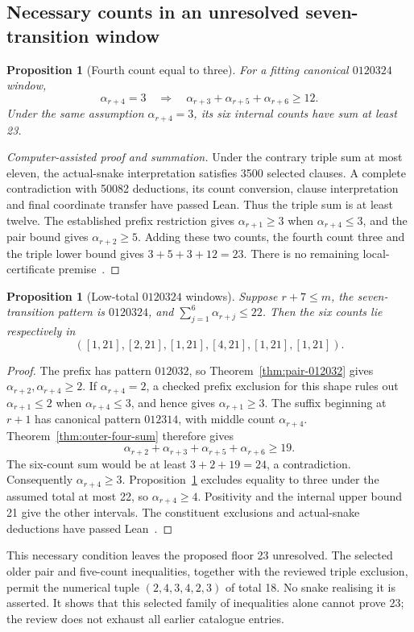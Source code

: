 \documentclass[11pt,a4paper]{article}
\newtheorem{proposition}[theorem]{Proposition}
\theoremstyle{definition}
\theoremstyle{remark}
\begin{document}
\subsection{Necessary counts in an unresolved seven-transition window}\label{sec:critical-six}
\begin{proposition}[Fourth count equal to three]\label{prop:fourth-three-twelve}
For a fitting canonical $0120324$ window,
\[
\alpha_{r+4}=3\quad\Longrightarrow\quad
\alpha_{r+3}+\alpha_{r+5}+\alpha_{r+6}\ge12.
\]
Under the same assumption $\alpha_{r+4}=3$, its six internal counts have sum at least 23.
\end{proposition}
\begin{proof}[Computer-assisted proof and summation]
Under the contrary triple sum at most eleven, the actual-snake interpretation
satisfies 3500 selected clauses. A complete contradiction with 50082 deductions,
its count conversion, clause interpretation and final coordinate transfer have
passed Lean. Thus the triple sum is at least twelve. The established prefix
restriction gives $\alpha_{r+1}\ge3$ when $\alpha_{r+4}\le3$, and the
pair bound gives $\alpha_{r+2}\ge5$. Adding these two counts, the fourth
count three and the triple lower bound gives $3+5+3+12=23$.
There is no remaining local-certificate premise~\cite{endpointcompletionarchive}.
\end{proof}


\begin{proposition}[Low-total $0120324$ windows]\label{prop:critical-six-intervals}
Suppose $r+7\le m$, the seven-transition pattern is $0120324$, and
$\sum_{j=1}^{6}\alpha_{r+j}\le22$. Then the six counts lie respectively in
\[
([1,21],[2,21],[1,21],[4,21],[1,21],[1,21]).
\]
\end{proposition}
\begin{proof}
The prefix has pattern $012032$, so Theorem~\ref{thm:pair-012032} gives
$\alpha_{r+2},\alpha_{r+4}\ge2$. If $\alpha_{r+4}=2$, a checked prefix
exclusion for this shape rules out $\alpha_{r+1}\le2$ when
$\alpha_{r+4}\le3$, and hence gives $\alpha_{r+1}\ge3$. The suffix beginning
at $r+1$ has canonical pattern $012314$, with middle count $\alpha_{r+4}$.
Theorem~\ref{thm:outer-four-sum} therefore gives
\[
\alpha_{r+2}+\alpha_{r+3}+\alpha_{r+5}+\alpha_{r+6}\ge19.
\]
The six-count sum would be at least $3+2+19=24$, a contradiction.
Consequently $\alpha_{r+4}\ge3$. Proposition~\ref{prop:fourth-three-twelve}
excludes equality to three under the assumed total at most 22, so
$\alpha_{r+4}\ge4$. Positivity and the internal upper bound 21 give the
other intervals. The constituent exclusions and actual-snake deductions
have passed Lean~\cite{criticalsixarchive,endpointcompletionarchive}.
\end{proof}
This necessary condition leaves the proposed floor 23 unresolved. The
selected older pair and five-count inequalities, together with the reviewed
triple exclusion, permit the numerical tuple $(2,4,3,4,2,3)$ of total 18.
No snake realising it is asserted. It shows that this selected family of
inequalities alone cannot prove 23; the review does not exhaust all earlier
catalogue entries.
\end{document}

